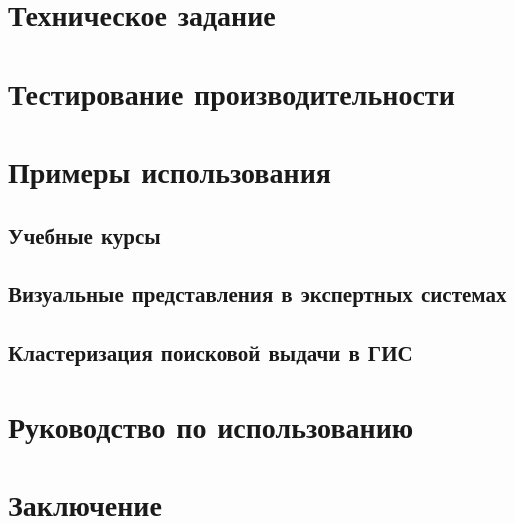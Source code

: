 \documentclass[a4paper,14pt,russian,nocolumnsxix,nocolumnxxxii,nocolumnxxxi,hpadding=10mm]{eskdtext}
\begin{document}
  \newpage

  \section{Техническое задание} %
  \section{Тестирование производительности} %
  \section{Примеры использования} %
  \subsection{Учебные курсы}
  \subsection{Визуальные представления в экспертных системах}
  \subsection{Кластеризация поисковой выдачи в ГИС}
  \section{Руководство по использованию} %
  \section{Заключение} %
  \newpage
  \tableofcontents 
\end{document}
